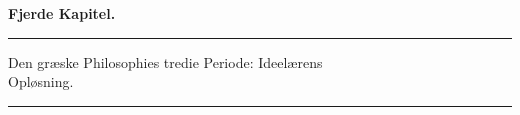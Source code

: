 \documentclass[12pt,a4paper]{book}
\newcommand{\divrule}{\begin{center}\rule{2cm}{0.4pt}\end{center}}
\begin{document}
\begin{center}
{\Large\textbf{Fjerde Kapitel.}}
\end{center}
\divrule
\begin{center}
{\Large Den græske Philosophies tredie Periode: Ideelærens\\
Opløsning.}
\end{center}
\divrule
\end{document}
